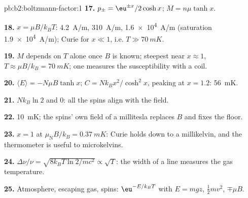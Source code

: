 \begin{solution}{pb:b2:boltzmann-factor:1}
\textbf{17.} $p_\pm = \eu^{\pm x}/2\cosh x$; $M = n\mu\tanh x$.

\textbf{18.} $x = \mu B/k_BT$: \qty{4.2}{A/m}, \qty{310}{A/m}, \qty{1.6e4}{A/m}
(saturation \qty{1.9e4}{A/m}); Curie for $x \ll 1$, i.e. $T \gg \qty{70}{mK}$.

\textbf{19.} $M$ depends on $T$ alone once $B$ is known; steepest near
$x \approx 1$, $T \approx \mu B/k_B = \qty{70}{mK}$; one measures the
susceptibility with a coil.

\textbf{20.} $\langle E\rangle = -N\mu B\tanh x$; $C = Nk_Bx^2/\cosh^2x$, peaking at
$x = 1.2$: \qty{56}{mK}.

\textbf{21.} $Nk_B\ln 2$ and $0$: all the spins align with the field.

\textbf{22.} \qty{10}{mK}; the spins' own field of a millitesla replaces $B$
and fixes the floor.

\textbf{23.} $x = 1$ at $\mu_{\text{N}}B/k_B = \qty{0.37}{mK}$: Curie holds down to a
millikelvin, and the thermometer is useful to microkelvins.

\textbf{24.} $\Delta\nu/\nu = \sqrt{8k_BT\ln2/mc^2} \propto \sqrt T$: the width
of a line measures the gas temperature.

\textbf{25.} Atmosphere, escaping gas, spins: $\eu^{-E/k_BT}$ with $E = mgz$,
$\tfrac12mv^2$, $\mp\mu B$.
\end{solution}
